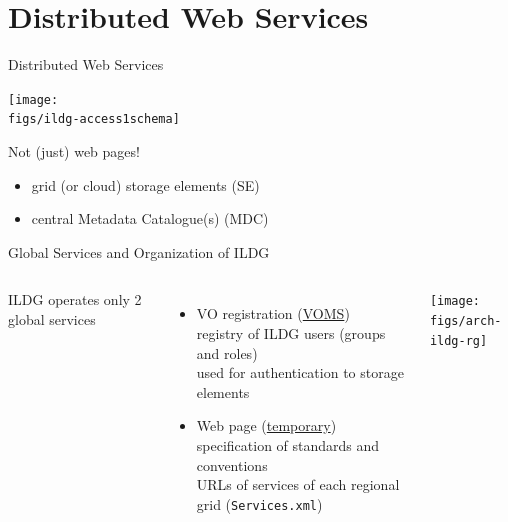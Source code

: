 \documentclass[aspectratio=169,xcolor=dvipsnames]{beamer}
\newcommand{\green}{\color{g3}}
\newcommand{\bi}{\begin{itemize}}
\newcommand{\ei}{\end{itemize}}
\def\figs{figs3}
\begin{document}
\section{Distributed Web Services}
\begin{frame}{Distributed Web Services}

  \begin{center}
    \texttt{[image: \\figs/ildg-access1schema]}
  \end{center}
    
  Not (just) web pages!
  \bi
  \item grid (or cloud) storage elements (SE)
  \item central Metadata Catalogue(s) (MDC)
  \ei

  
\end{frame}
\begin{frame}{Global Services and Organization of ILDG}
  \vspace*{3mm}
  \begin{columns}[c]
    ILDG operates only \alert{2 global services}
    \begin{itemize}
    \item VO registration (\href{https://grid-voms.desy.de:8443/voms/ildg}{\green VOMS}) \\[1mm]
      {\small
        registry of ILDG users (groups and roles)\\
        used for authentication to storage elements
        }
    \item Web page (\href{https://hpc.desy.de/ildg}{\green temporary})\\[1mm]
      {\small 
        specification of standards and conventions\\
        URLs of services of each regional grid ({\tt Services.xml})
      }
    \end{itemize}

    \vspace*{5mm}
    \texttt{[image: \\figs/arch-ildg-rg]}
  \end{columns}

\end{frame}
\end{document}

